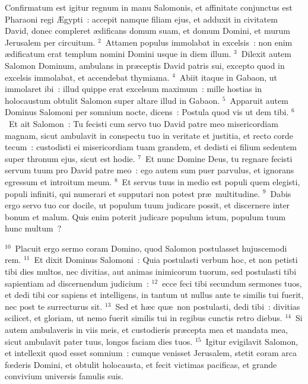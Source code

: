\lettrine[lines=10,image=true,loversize=0.05,lraise=-0.03]{C}{}onfirmatum est igitur regnum in manu Salomonis, et affinitate conjunctus est Pharaoni regi \AE gypti~: accepit namque filiam ejus, et adduxit in civitatem David, donec compleret \ae dificans domum suam, et domum Domini, et murum Jerusalem per circuitum.
${}^{2}$~Attamen populus immolabat in excelsis~: non enim \ae dificatum erat templum nomini Domini usque in diem illum.
${}^{3}$~Dilexit autem Salomon Dominum, ambulans in pr\ae ceptis David patris sui, excepto quod in excelsis immolabat, et accendebat thymiama.
${}^{4}$~Abiit itaque in Gabaon, ut immolaret ibi~: illud quippe erat excelsum maximum~: mille hostias in holocaustum obtulit Salomon super altare illud in Gabaon.
${}^{5}$~Apparuit autem Dominus Salomoni per somnium nocte, dicens~: Postula quod vis ut dem tibi.
${}^{6}$~Et ait Salomon~: Tu fecisti cum servo tuo David patre meo misericordiam magnam, sicut ambulavit in conspectu tuo in veritate et justitia, et recto corde tecum~: custodisti ei misericordiam tuam grandem, et dedisti ei filium sedentem super thronum ejus, sicut est hodie.
${}^{7}$~Et nunc Domine Deus, tu regnare fecisti servum tuum pro David patre meo~: ego autem sum puer parvulus, et ignorans egressum et introitum meum.
${}^{8}$~Et servus tuus in medio est populi quem elegisti, populi infiniti, qui numerari et supputari non potest pr\ae\ multitudine.
${}^{9}$~Dabis ergo servo tuo cor docile, ut populum tuum judicare possit, et discernere inter bonum et malum. Quis enim poterit judicare populum istum, populum tuum hunc multum~?


${}^{10}$~Placuit ergo sermo coram Domino, quod Salomon postulasset hujuscemodi rem.
${}^{11}$~Et dixit Dominus Salomoni~: Quia postulasti verbum hoc, et non petisti tibi dies multos, nec divitias, aut animas inimicorum tuorum, sed postulasti tibi sapientiam ad discernendum judicium~:
${}^{12}$~ecce feci tibi secundum sermones tuos, et dedi tibi cor sapiens et intelligens, in tantum ut nullus ante te similis tui fuerit, nec post te surrecturus sit.
${}^{13}$~Sed et h\ae c qu\ae\ non postulasti, dedi tibi~: divitias scilicet, et gloriam, ut nemo fuerit similis tui in regibus cunctis retro diebus.
${}^{14}$~Si autem ambulaveris in viis meis, et custodieris pr\ae cepta mea et mandata mea, sicut ambulavit pater tuus, longos faciam dies tuos.
${}^{15}$~Igitur evigilavit Salomon, et intellexit quod esset somnium~: cumque venisset Jerusalem, stetit coram arca fœderis Domini, et obtulit holocausta, et fecit victimas pacificas, et grande convivium universis famulis suis.


